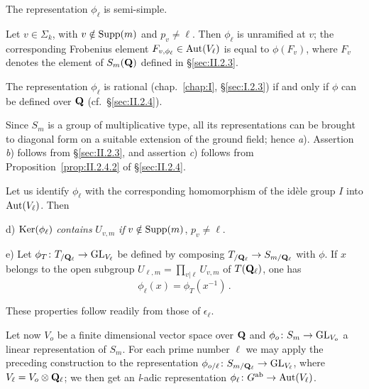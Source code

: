 \begin{proposition}
\begin{alist}[label=\alph*)]
\item The representation $\phi_\ell$ is semi-simple.
\item Let $v \in \Sigma_k$, with $v \notin \mathrm{Supp}(m)$ and
$p_v \neq \ell$.  Then $\phi_\ell$ is unramified at $v$; the
corresponding Frobenius element $F_{v,\phi_\ell} \in \mathrm{Aut}(V_\ell)$ is
equal to $\phi(F_v)$, where $F_v$ denotes the element of $S_m(\mathbf{Q})$
defined in \S\ref{sec:II.2.3}.
\item The representation $\phi_\ell$ is rational
(chap.~\ref{chap:I}, \S\ref{sec:I.2.3}) if and only if $\phi$ can be
defined over $\mathbf{Q}$ (cf.~\S\ref{sec:II.2.4}).
\end{alist}
\end{proposition}

Since $S_m$ is a group of multiplicative type, all its representations
can be brought to diagonal form on a suitable extension of the ground
field; hence \emph{a}).  Assertion \emph{b}) follows from
\S\ref{sec:II.2.3}, and assertion \emph{c}) follows from
Proposition~\ref{prop:II.2.4.2} of \S\ref{sec:II.2.4}.


Let us identify $\phi_\ell$ with the corresponding homomorphism of the
idèle group $I$ into $\mathrm{Aut}(V_\ell)$.  Then

d) $\mathrm{Ker}(\phi_\ell)$ \emph{contains} $U_{v,m}$ \emph{if}
$v \notin \mathrm{Supp}(m)$, $p_v \neq \ell$.

e) Let $\phi_T\colon T_{/\mathbf{Q}_\ell} \to \mathrm{GL}_{V_\ell}$ be defined by
composing $T_{/\mathbf{Q}_\ell} \to S_{m/\mathbf{Q}_\ell}$ with $\phi$.  If $x$ belongs
to the open subgroup $U_{\ell,m} = \prod\limits_{v|\ell} U_{v,m}$ of
$T(\mathbf{Q}_\ell)$, one has
\[
\phi_\ell(x) = \phi_T(x^{-1})\,.
\]

These properties follow readily from those of $\epsilon_\ell$.


Let now $V_o$ be a finite dimensional vector space over $\mathbf{Q}$ and
$\phi_o\colon S_m \to \mathrm{GL}_{V_o}$ a linear representation of $S_m$.  For
each prime number $\ell$ we may apply the preceding construction to the
representation $\phi_{o/\ell}\colon S_{m/\mathbf{Q}_\ell} \to \mathrm{GL}_{V_\ell}$,
where $V_\ell = V_o \mathbin{\otimes} \mathbf{Q}_\ell$; we then get an \textit{l}-adic
representation $\phi_\ell\colon G^{\mathrm{ab}} \to \mathrm{Aut}(V_\ell)$.

